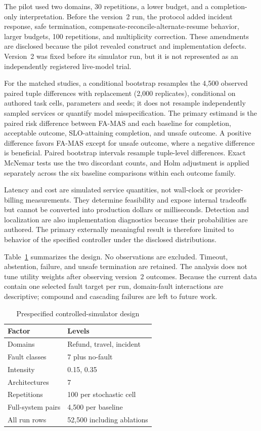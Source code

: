 \documentclass[10pt,journal,compsoc]{IEEEtran}
\newcommand{\famas}{FA-MAS}
\begin{document}
The pilot used two domains, 30 repetitions, a lower budget, and a completion-only interpretation. Before the version~2 run, the protocol added incident response, safe termination, compensate-reconcile-alternate-resume behavior, larger budgets, 100 repetitions, and multiplicity correction. These amendments are disclosed because the pilot revealed construct and implementation defects. Version~2 was fixed before its simulator run, but it is not represented as an independently registered live-model trial.

For the matched studies, a conditional bootstrap resamples the 4,500 observed paired tuple differences with replacement (2,000 replicates), conditional on authored task cells, parameters and seeds; it does not resample independently sampled services or quantify model misspecification. The primary estimand is the paired risk difference between \famas{} and each baseline for completion, acceptable outcome, SLO-attaining completion, and unsafe outcome. A positive difference favors \famas{} except for unsafe outcome, where a negative difference is beneficial. Paired bootstrap intervals resample tuple-level differences. Exact McNemar tests use the two discordant counts, and Holm adjustment is applied separately across the six baseline comparisons within each outcome family.

Latency and cost are simulated service quantities, not wall-clock or provider-billing measurements. They determine feasibility and expose internal tradeoffs but cannot be converted into production dollars or milliseconds. Detection and localization are also implementation diagnostics because their probabilities are authored. The primary externally meaningful result is therefore limited to behavior of the specified controller under the disclosed distributions.

Table~\ref{tab:design} summarizes the design. No observations are excluded. Timeout, abstention, failure, and unsafe termination are retained. The analysis does not tune utility weights after observing version~2 outcomes. Because the current data contain one selected fault target per run, domain-fault interactions are descriptive; compound and cascading failures are left to future work.

\begin{table}[!t]
\centering
\caption{Prespecified controlled-simulator design}\label{tab:design}
\footnotesize
\begin{tabular}{@{}ll@{}}
\toprule
Factor & Levels\\
\midrule
Domains & Refund, travel, incident\\
Fault classes & 7 plus no-fault\\
Intensity & 0.15, 0.35\\
Architectures & 7\\
Repetitions & 100 per stochastic cell\\
Full-system pairs & 4,500 per baseline\\
All run rows & 52,500 including ablations\\
\bottomrule
\end{tabular}
\end{table}
\end{document}
